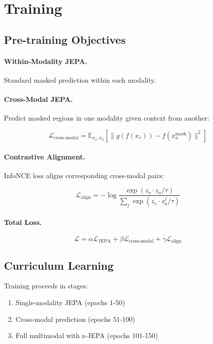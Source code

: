 \section{Training}


\subsection{Pre-training Objectives}

\paragraph{Within-Modality JEPA.} Standard masked prediction within each modality.

\paragraph{Cross-Modal JEPA.} Predict masked regions in one modality given context from another:

\begin{equation}
    \mathcal{L}_{\text{cross-modal}} = \mathbb{E}_{x_v, x_a} \left[ \|g(f(x_v)) - f(x_a^{\text{mask}})\|^2 \right]
\end{equation}

\paragraph{Contrastive Alignment.} InfoNCE loss aligns corresponding cross-modal pairs:

\begin{equation}
    \mathcal{L}_{\text{align}} = -\log \frac{\exp(z_v \cdot z_a / \tau)}{\sum_j \exp(z_v \cdot z_a^j / \tau)}
\end{equation}

\paragraph{Total Loss.}
\begin{equation}
    \mathcal{L} = \alpha \mathcal{L}_{\text{JEPA}} + \beta \mathcal{L}_{\text{cross-modal}} + \gamma \mathcal{L}_{\text{align}}
\end{equation}

\subsection{Curriculum Learning}

Training proceeds in stages:
\begin{enumerate}
    \item Single-modality JEPA (epochs 1-50)
    \item Cross-modal prediction (epochs 51-100)
    \item Full multimodal with z-JEPA (epochs 101-150)
\end{enumerate}

